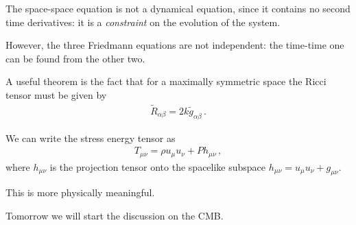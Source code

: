 \documentclass[main.tex]{subfiles}
\begin{document}
The space-space equation is not a dynamical equation, since it contains no second time derivatives: it is a \emph{constraint} on the evolution of the system. 

However, the three Friedmann equations are not independent: the time-time one can be found from the other two. 

A useful theorem is the fact that for a maximally symmetric space the Ricci tensor must be given by
%
\begin{align}
\widetilde{R}_{\alpha \beta } = 2 k \widetilde{g}_{\alpha \beta }
\,. 
\end{align}

We can write the stress energy tensor as 
%
\begin{align}
T_{\mu \nu } = \rho u_{\mu } u_{\nu } + P h_{\mu \nu }
\,,
\end{align}
%
where \(h_{\mu \nu } \) is the projection tensor onto the spacelike subspace \(h_{\mu \nu } = u_{\mu} u_{\nu } + g_{\mu \nu }\). 

This is more physically meaningful. 

Tomorrow we will start the discussion on the CMB. 
\end{document}
